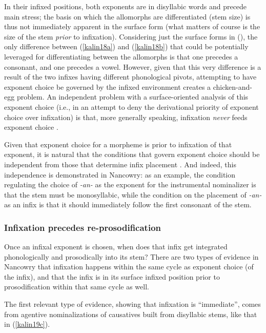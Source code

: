 \documentclass[output=paper,colorlinks,citecolor=brown,
]{langscibook}
\newcounter{lasttmp}    %
\newcommand{\Last}{\setcounter{lasttmp}{\value{equation}}(\thelasttmp)\xspace}
\begin{document}
\noindent In their infixed positions, both exponents are in disyllabic words and precede main stress; the basis on which the allomorphs are differentiated (stem size) is thus not immediately apparent in the surface form (what matters of course is the size of the stem \textit{prior} to infixation). Considering just the surface forms in \Last, the only difference between (\ref{kalin18a}) and (\ref{kalin18b}) that could be potentially leveraged for differentiating between the allomorphs is that one precedes a consonant, and one precedes a vowel. However, given that this very difference is a result of the two infixes having different phonological pivots, attempting to have exponent choice be governed by the infixed environment creates a chicken-and-egg problem. An independent problem with a surface-oriented analysis of this exponent choice (i.e., in an attempt to deny the derivational priority of exponent choice over infixation) is that, more  generally speaking, infixation {\it never} feeds exponent choice \citep{KalinIP}.  

Given that exponent choice for a morpheme is prior to infixation of that exponent, it is natural that the conditions that govern exponent choice should be independent from those that determine infix placement  \citep{KalinRolle21}. And indeed, this independence is demonstrated in Nancowry: as an example, the condition regulating the choice of \textit{-an-} as the exponent for the instrumental nominalizer is that the stem must be monosyllabic, while the condition on the placement of \textit{-an-} as an infix is that it should immediately follow the first consonant of the stem.

\subsubsection{Infixation precedes re-prosodification}\label{kalininford}

Once an infixal exponent is chosen, when does that infix get integrated phonologically and prosodically into its stem? There are two types of evidence in Nancowry that infixation happens within the same cycle as exponent choice (of the infix), and that the infix is in its surface infixed position prior to prosodification within that same cycle as well. 

The first relevant type of evidence, showing that infixation is ``immediate'', comes from agentive nominalizations of causatives built from disyllabic stems, like that in (\ref{kalin19c}).
\end{document}

